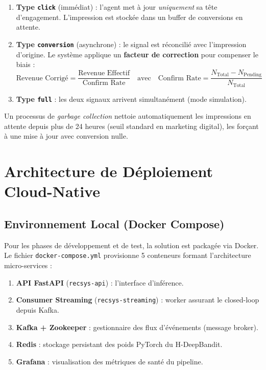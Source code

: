 \begin{enumerate}
    \item \textbf{Type \texttt{click}} (immédiat) : l'agent met à jour \textit{uniquement} sa tête d'engagement. L'impression est stockée dans un buffer de conversions en attente.
    \item \textbf{Type \texttt{conversion}} (asynchrone) : le signal est réconcilié avec l'impression d'origine. Le système applique un \textbf{facteur de correction} pour compenser le biais :
    $$\text{Revenue Corrigé} = \frac{\text{Revenue Effectif}}{\text{Confirm Rate}} \quad \text{avec} \quad \text{Confirm Rate} = \frac{N_{\text{Total}} - N_{\text{Pending}}}{N_{\text{Total}}}$$
    \item \textbf{Type \texttt{full}} : les deux signaux arrivent simultanément (mode simulation).
\end{enumerate}

Un processus de \textit{garbage collection} nettoie automatiquement les impressions en attente depuis plus de 24 heures (seuil standard en marketing digital), les forçant à une mise à jour avec conversion nulle.


\section{Architecture de Déploiement Cloud-Native}
\label{sec:deploiement}

\subsection{Environnement Local (Docker Compose)}

Pour les phases de développement et de test, la solution est packagée via Docker. Le fichier \texttt{docker-compose.yml} provisionne 5 conteneurs formant l'architecture micro-services :

\begin{enumerate}
    \item \textbf{API FastAPI} (\texttt{recsys-api}) : l'interface d'inférence.
    \item \textbf{Consumer Streaming} (\texttt{recsys-streaming}) : worker assurant le closed-loop depuis Kafka.
    \item \textbf{Kafka + Zookeeper} : gestionnaire des flux d'événements (message broker).
    \item \textbf{Redis} : stockage persistant des poids PyTorch du H-DeepBandit.
    \item \textbf{Grafana} : visualisation des métriques de santé du pipeline.
\end{enumerate}

